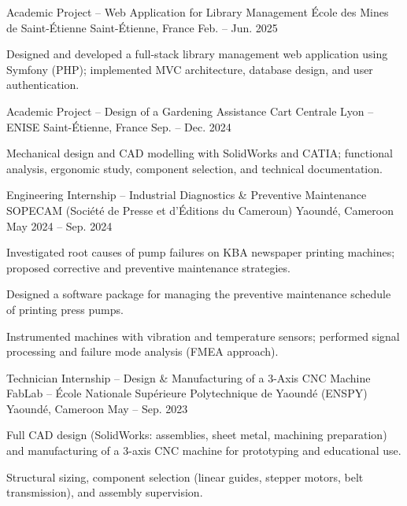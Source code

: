 \documentclass[11pt, a4paper]{awesome-cv}
\begin{document}
\begin{cventries}
  \cventry
    {Academic Project – Web Application for Library Management}
    {\'Ecole des Mines de Saint-\'Etienne}
    {Saint-Étienne, France}
    {Feb. -- Jun. 2025}
    {
      \begin{cvitems}
        \item Designed and developed a full-stack library management web application using Symfony (PHP); implemented MVC architecture, database design, and user authentication.
      \end{cvitems}
    }

  \cventry
    {Academic Project – Design of a Gardening Assistance Cart}
    {Centrale Lyon -- ENISE}
    {Saint-\'Etienne, France}
    {Sep. -- Dec. 2024}
    {
      \begin{cvitems}
        \item Mechanical design and CAD modelling with SolidWorks and CATIA; functional analysis, ergonomic study, component selection, and technical documentation.
      \end{cvitems}
    }

  \cventry
    {Engineering Internship – Industrial Diagnostics \& Preventive Maintenance}
    {SOPECAM (Société de Presse et d'Éditions du Cameroun)}
    {Yaoundé, Cameroon}
    {May 2024 -- Sep. 2024}
    {
      \begin{cvitems}
        \item Investigated root causes of pump failures on KBA newspaper printing machines; proposed corrective and preventive maintenance strategies.
        \item Designed a software package for managing the preventive maintenance schedule of printing press pumps.
        \item Instrumented machines with vibration and temperature sensors; performed signal processing and failure mode analysis (FMEA approach).
      \end{cvitems}
    }

  \cventry
    {Technician Internship – Design \& Manufacturing of a 3-Axis CNC Machine}
    {FabLab -- \'Ecole Nationale Sup\'erieure Polytechnique de Yaound\'e (ENSPY)}
    {Yaoundé, Cameroon}
    {May -- Sep. 2023}
    {
      \begin{cvitems}
        \item Full CAD design (SolidWorks: assemblies, sheet metal, machining preparation) and manufacturing of a 3-axis CNC machine for prototyping and educational use.
        \item Structural sizing, component selection (linear guides, stepper motors, belt transmission), and assembly supervision.
      \end{cvitems}
    }

\end{cventries}
\end{document}

